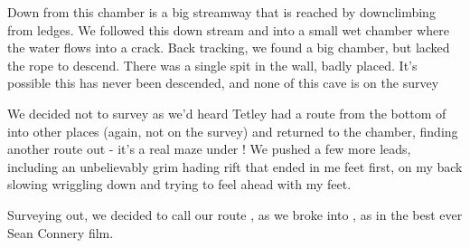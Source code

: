 Down from this chamber is a big streamway that is reached by downclimbing from ledges. We followed this down stream and into a small wet chamber where the water flows into a crack. Back tracking, we found a big chamber, but lacked the rope to descend. There was a single spit in the wall, badly placed. It’s possible this has never been descended, and none of this cave is on the survey

We decided not to survey as we’d heard Tetley had a route from the bottom of  into other places (again, not on the survey) and returned to the chamber, finding another route out - it’s a real maze under ! We pushed a few more leads, including an unbelievably grim hading rift that ended in me feet first, on my back slowing wriggling down and trying to feel ahead with my feet.

Surveying out, we decided to call our route , as we broke into , as in the best ever Sean Connery film.

